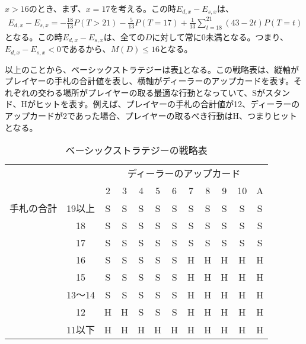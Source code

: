        \subsubsection{}
            $x>16$のとき、まず、$x=17$を考える。この時$E_{d,x}-E_{s,x}$は、
            \begin{displaymath}
                \begin{split}
                    E_{d,x}-E_{s,x}=-\frac{18}{13}P(T>21)-\frac{5}{13}P(T=17)+\frac{1}{13}\sum_{t=18}^{21}(43-2t)P(T=t)
                \end{split}
            \end{displaymath}
            となる。この時$E_{d,x}-E_{s,x}$は、全ての$D$に対して常に0未満となる。つまり、$E_{d,x}-E_{s,x}<0$であるから、$M(D)\leq 16$となる。
        
        以上のことから、ベーシックストラテジーは表\ref{kihonsenryaku}となる。この戦略表は、縦軸がプレイヤーの手札の合計値を表し、横軸がディーラーのアップカードを表す。それぞれの交わる場所がプレイヤーの取る最適な行動となっていて、Sがスタンド、Hがヒットを表す。例えば、プレイヤーの手札の合計値が12、ディーラーのアップカードが2であった場合、プレイヤーの取るべき行動はH、つまりヒットとなる。
        \begin{table}[H]
            \begin{center}
            \caption{ベーシックストラテジーの戦略表}
            \label{kihonsenryaku}
            \begin{tabular}{|lc|c|c|c|c|c|c|c|c|c|c|}
                \hline
                                            &       & \multicolumn{10}{c|}{ディーラーのアップカード}     \\ \cline{3-12} 
                                            &       & 2 & 3 & 4 & 5 & 6 & 7 & 8 & 9 & 10 & A \\ \hline
                \multicolumn{1}{|l|}{手札の合計} & 19以上  & S & S & S & S & S & S & S & S & S  & S \\ \cline{2-12} 
                \multicolumn{1}{|l|}{}      & 18    & S & S & S & S & S & S & S & S & S  & S \\ \cline{2-12} 
                \multicolumn{1}{|l|}{}      & 17    & S & S & S & S & S & S & S & S & S  & S \\ \cline{2-12} 
                \multicolumn{1}{|l|}{}      & 16    & S & S & S & S & S & H & H & H & H  & H \\ \cline{2-12} 
                \multicolumn{1}{|l|}{}      & 15    & S & S & S & S & S & H & H & H & H  & H \\ \cline{2-12} 
                \multicolumn{1}{|l|}{}      & 13～14 & S & S & S & S & S & H & H & H & H  & H \\ \cline{2-12} 
                \multicolumn{1}{|l|}{}      & 12    & H & H & S & S & S & H & H & H & H  & H \\ \cline{2-12} 
                \multicolumn{1}{|l|}{}      & 11以下  & H & H & H & H & H & H & H & H & H  & H \\ \hline
                \end{tabular}
            \end{center}
            \end{table}
    
